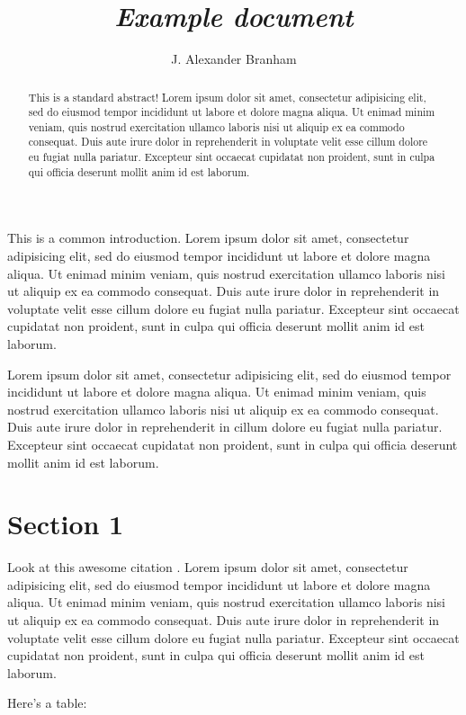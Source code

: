 \documentclass[12pt]{article}
\title{\emph{Example document}}
\author{J. Alexander Branham}
\begin{document}
\maketitle{}
\begin{abstract}
This is a standard abstract! Lorem ipsum dolor sit amet, consectetur adipisicing elit, sed do eiusmod tempor incididunt ut labore et dolore magna aliqua. Ut enimad minim veniam, quis nostrud exercitation ullamco laboris nisi ut aliquip ex ea commodo consequat. Duis aute irure dolor in reprehenderit in voluptate velit esse cillum dolore eu fugiat nulla pariatur. Excepteur sint occaecat cupidatat non proident, sunt in culpa qui officia deserunt mollit anim id est laborum.
\end{abstract}

This is a common introduction. Lorem ipsum dolor sit amet, consectetur adipisicing elit, sed do eiusmod tempor incididunt ut labore et dolore magna aliqua. Ut enimad minim veniam, quis nostrud exercitation ullamco laboris nisi ut aliquip ex ea commodo consequat. Duis aute irure dolor in reprehenderit in voluptate velit esse cillum dolore eu fugiat nulla pariatur. Excepteur sint occaecat cupidatat non proident, sunt in culpa qui officia deserunt mollit anim id est laborum.

Lorem ipsum dolor sit amet, consectetur adipisicing elit, sed do eiusmod tempor incididunt ut labore et dolore magna aliqua. Ut enimad minim veniam, quis nostrud exercitation ullamco laboris nisi ut aliquip ex ea commodo consequat. Duis aute irure dolor in reprehenderit in cillum dolore eu fugiat nulla pariatur. Excepteur sint occaecat cupidatat non proident, sunt in culpa qui officia deserunt mollit anim id est laborum.

\section{Section 1}
\label{sec:section-1}

Look at this awesome citation \autocite{apfeld2016}. Lorem ipsum dolor sit amet, consectetur adipisicing elit, sed do eiusmod tempor incididunt ut labore et dolore magna aliqua. Ut enimad minim veniam, quis nostrud exercitation ullamco laboris nisi ut aliquip ex ea commodo consequat. Duis aute irure dolor in reprehenderit in voluptate velit esse cillum dolore eu fugiat nulla pariatur. Excepteur sint occaecat cupidatat non proident, sunt in culpa qui officia deserunt mollit anim id est laborum.

Here's a table:
\end{document}
